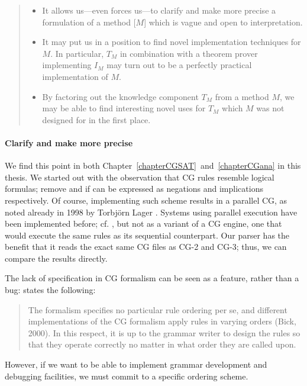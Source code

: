 \begin{quote}
\begin{itemize}
\item It allows us---even forces us---to clarify and make more precise a formulation of a method [$M$] which is vague and open to interpretation.
\item It may put us in a position to find novel implementation techniques for $M$. 
In particular, $T_M$ in combination with a theorem prover implementing $I_M$ may turn out to be a perfectly practical implementation of $M$.
\item By factoring out the knowledge component $T_M$ from a method $M$, 
we may be able to find interesting novel uses for $T_M$ which $M$ was not designed for in the first place.
\end{itemize}
\end{quote}


\paragraph{Clarify and make more precise} We find this point in both Chapter~\ref{chapterCGSAT}~and~\ref{chapterCGana} in this thesis. 
We started out with the observation that CG rules resemble logical formulas; {\sc remove} and {\sc if} can be expressed as negations and implications respectively. Of course, implementing such scheme results in a parallel CG, 
as noted already in 1998 by Torbjörn Lager \cite{lager98}.
Systems using parallel execution have been implemented before; cf. \cite{koskenniemi90,voutilainen1994designing,oflazer1997votingconstraints}, but not as a variant of a CG engine, one that would execute the same rules as its sequential counterpart.
Our parser has the benefit that it reads the exact same CG files as CG-2 and CG-3; thus, we can compare the results directly. 

The lack of specification in CG formalism can be seen as a feature, rather than a bug: \cite{hulden2011cg_engine} states the following:

\begin{quote} 
The formalism specifies no particular rule ordering per se, and different implementations of the CG formalism apply rules in varying orders (Bick, 2000).  In this respect, it is up to the grammar writer to design the rules so that they operate correctly no matter in what  order  they  are  called  upon. 
\end{quote}

\noindent However, if we want to be able to implement grammar development and debugging facilities, we must commit to a specific ordering scheme. 

